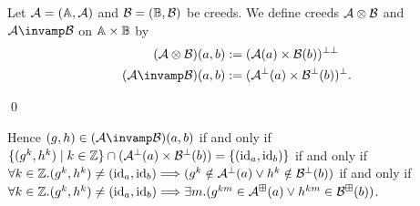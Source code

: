 Let \( \mathcal{A} = (\mathbb{A}, \mathcal{A}) \) and \( \mathcal{B} = (\mathbb{B}, \mathcal{B}) \) be creeds.
We define creeds \( \mathcal{A} \otimes \mathcal{B} \) and \( \creed \llpar \creedb \) on \( \mathbb{A} \times \mathbb{B} \) by
\begin{align*}
    (\creed \otimes \creedb)(a,b) 
    &:= (\creed(a) \times \creedb(b))^{\bot\bot} \\
    (\creed \llpar \creedb)(a,b)
    &:= (\creed^\bot(a) \times \creedb^\bot(b))^\bot.
\end{align*}

\begin{remark}
    \qed
\end{remark}

Hence \( (g, h) \in (\creed \llpar \creedb)(a,b) \) if and only if \( \{ (g^k, h^k) \mid k \in \mathbb{Z} \} \cap (\mathcal{A}^\bot(a) \times \mathcal{B}^\bot(b)) = \{ (\mathrm{id}_a, \mathrm{id}_b) \} \) if and only if \( \forall k \in \mathbb{Z}. (g^k, h^k) \neq (\mathrm{id}_a, \mathrm{id}_b) \Longrightarrow (g^k \notin \mathcal{A}^\bot(a) \vee h^k \notin \mathcal{B}^\bot(b)) \) if and only if \( \forall k \in \mathbb{Z}. (g^k, h^k) \neq (\mathrm{id}_a, \mathrm{id}_b) \Longrightarrow \exists m. (g^{km} \in \mathcal{A}^\boxplus(a) \vee h^{km} \in \mathcal{B}^\boxplus(b)) \).



